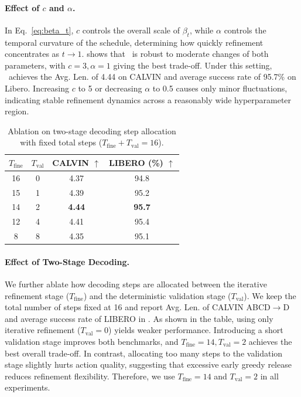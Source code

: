 \paragraph{Effect of $c$ and $\alpha$.}
In Eq.~\ref{eq:beta_t}, $c$ controls the overall scale of $\beta_t$, while $\alpha$ controls the temporal curvature of the schedule, determining how quickly refinement concentrates as $t\!\to\!1$.
 shows that \method~is robust to moderate changes of both parameters, with $c=3,\alpha=1$ giving the best  trade-off.
Under this setting, \method~achieves the  Avg. Len. of 4.44 on CALVIN and average success rate of 95.7\% on Libero. 
Increasing $c$ to 5 or decreasing $\alpha$ to 0.5 causes only minor fluctuations, indicating stable refinement dynamics across a reasonably wide hyperparameter region.

\begin{table}
    \vspace{-10mm}
    \centering
    \footnotesize
    \setlength{\tabcolsep}{5pt}
    \caption{Ablation on two-stage decoding step allocation with fixed total steps ($T_{\mathrm{fine}} + T_{\mathrm{val}} = 16$).}
    \label{tab:ablation_two_stage}
    \begin{tabular}{c | c | c |c}
        \toprule
        $T_{\mathrm{fine}}$ & $T_{\mathrm{val}}$ & CALVIN $\uparrow$ & LIBERO (\%) $\uparrow$ \\
        \midrule
        16 & 0  & 4.37 & 94.8 \\
        15 & 1  & 4.39 & 95.2 \\
        14 & 2  & \textbf{4.44} & \textbf{95.7} \\
        12 & 4  & 4.41 & 95.4 \\
        8  & 8  & 4.35 & 95.1 \\
        \bottomrule
    \end{tabular}
    \vspace{-3mm}
\end{table}
\paragraph{Effect of Two-Stage Decoding.}
We further ablate how decoding steps are allocated between the iterative refinement stage ($T_{\mathrm{fine}}$) and the deterministic validation stage ($T_{\mathrm{val}}$). We keep the total number of steps fixed at 16 and report Avg. Len. of CALVIN ABCD$\rightarrow$D  and average success rate of LIBERO in . As shown in the table, using only iterative refinement  ($T_{\mathrm{val}}=0$) yields weaker performance. Introducing a short validation stage improves both benchmarks, and $T_{\mathrm{fine}}=14, T_{\mathrm{val}}=2$ achieves the best overall trade-off. In contrast, allocating too many steps to the validation stage slightly hurts action quality, suggesting that excessive early greedy release reduces refinement flexibility. Therefore, we use $T_{\mathrm{fine}}=14$ and $T_{\mathrm{val}}=2$ in all experiments.



